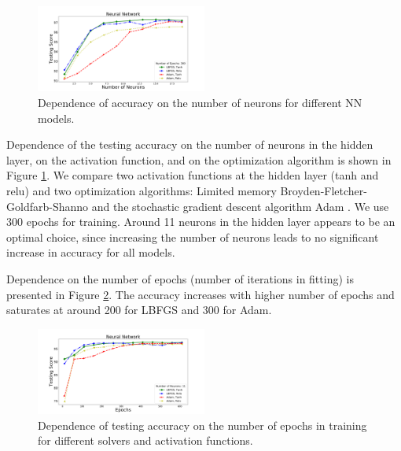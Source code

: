 \begin{figure}[h]

\hspace*{-0.5cm}
\includegraphics[width=0.5\textwidth]{plots/nn_train_neurons_assocnewfeat.pdf}
\caption{Dependence of accuracy on the number of neurons for different NN models.}
\label{fig:NN_neurons}
\end{figure}

Dependence of the testing accuracy on the number of neurons in the hidden layer, on the activation function, 
and on the optimization algorithm is shown in Figure \ref{fig:NN_neurons}. 
We compare two activation functions at the hidden layer (tanh and relu) and two optimization algorithms: 
Limited memory Broyden-Fletcher-Goldfarb-Shanno \citep[LBFGS,][]{lbfgs} 
and the stochastic gradient descent algorithm Adam \citep{2014arXiv1412.6980K}.
We use 300 epochs for training.
Around 11 neurons in the hidden layer appears to be an optimal choice, since increasing the number of neurons leads to no significant increase in accuracy for all models. 

Dependence on the number of epochs (number of iterations in fitting) is presented in Figure \ref{fig:NN_epochs}. 
The accuracy increases with higher number of epochs and saturates at around 200 for LBFGS and 300 for Adam. 




\begin{figure}[h]
\hspace*{-0.5cm}
\includegraphics[width=0.5\textwidth]{plots/nn_train_epochs_assocnewfeat.pdf}
\caption{
Dependence of testing accuracy on the number of epochs in training for different solvers and activation functions.
}
\label{fig:NN_epochs}
\end{figure}
 
